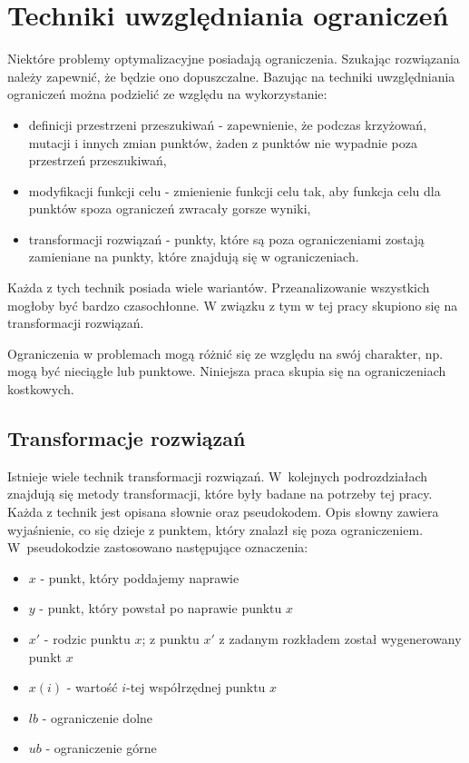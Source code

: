 \documentclass{mini}
\begin{document}
\pagebreak

\section{Techniki uwzględniania ograniczeń} \label{technikiogr}
\hspace{3,4ex}Niektóre problemy optymalizacyjne posiadają ograniczenia. Szukając rozwiązania należy zapewnić, że będzie ono dopuszczalne. Bazując na \cite{wyklady} techniki uwzględniania ograniczeń można podzielić ze względu na wykorzystanie:
\begin{itemize}[noitemsep]
\item definicji przestrzeni przeszukiwań - zapewnienie, że podczas krzyżowań, mutacji i innych zmian punktów, żaden z punktów nie wypadnie poza przestrzeń przeszukiwań,
\item modyfikacji funkcji celu - zmienienie funkcji celu tak, aby funkcja celu dla punktów spoza ograniczeń zwracały gorsze wyniki,
\item transformacji rozwiązań - punkty, które są poza ograniczeniami zostają zamieniane na punkty, które znajdują się w ograniczeniach.
\end{itemize}

Każda z tych technik posiada wiele wariantów. Przeanalizowanie wszystkich mogłoby być bardzo czasochłonne. W związku z tym w tej pracy skupiono się na transformacji rozwiązań.

Ograniczenia w problemach mogą różnić się ze względu na swój charakter, np. mogą być nieciągłe lub punktowe. Niniejsza praca skupia się na ograniczeniach kostkowych.

\subsection{Transformacje rozwiązań} \label{transformacje}
\hspace{3,4ex}Istnieje wiele technik transformacji rozwiązań. W~kolejnych podrozdziałach znajdują się metody transformacji, które były badane na potrzeby tej pracy. Każda z technik jest opisana słownie oraz pseudokodem. Opis słowny zawiera wyjaśnienie, co się dzieje z punktem, który znalazł się poza ograniczeniem. W~pseudokodzie zastosowano następujące oznaczenia:
\begin{itemize}[noitemsep]
\item $x$ - punkt, który poddajemy naprawie
\item $y$ - punkt, który powstał po naprawie punktu $x$
\item $x'$ - rodzic punktu $x$; z punktu $x'$ z zadanym rozkładem został wygenerowany punkt $x$
\item $x(i)$ - wartość $i$-tej współrzędnej punktu $x$
\item $lb$ - ograniczenie dolne
\item $ub$ - ograniczenie górne
\end{itemize}
\end{document}
